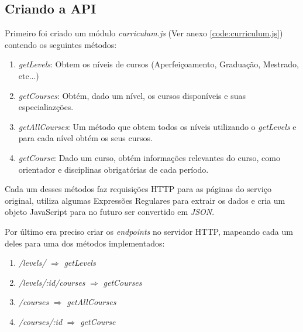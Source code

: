 \subsection{Criando a API}

Primeiro foi criado um módulo \textit{curriculum.js} (Ver anexo \ref{code:curriculum.js}) contendo os seguintes métodos:

\begin{enumerate}
	\item \textit{getLevels}: Obtem os níveis de cursos (Aperfeiçoamento, Graduação, Mestrado, etc...)
	\item \textit{getCourses}: Obtém, dado um nível, os cursos disponíveis e suas especialiazções.
	\item \textit{getAllCourses}: Um método que obtem todos os níveis utilizando o \textit{getLevels} e para cada nível obtém os seus cursos.
	\item \textit{getCourse}: Dado um curso, obtém informações relevantes do curso, como orientador e disciplinas obrigatórias de cada período.
\end{enumerate}

Cada um desses métodos faz requisições HTTP para as páginas do serviço original, utiliza algumas Expressões Regulares para extrair os dados e cria um objeto JavaScript para no futuro ser convertido em \textit{JSON}.

Por último era preciso criar os \textit{endpoints} no servidor HTTP, mapeando cada um deles para uma dos métodos implementados:

\begin{enumerate}
	\item \textit{/levels/} $\Rightarrow$ \textit{getLevels}
	\item \textit{/levels/:id/courses} $\Rightarrow$ \textit{getCourses}
	\item \textit{/courses} $\Rightarrow$ \textit{getAllCourses}
	\item \textit{/courses/:id} $\Rightarrow$ \textit{getCourse}
\end{enumerate}

